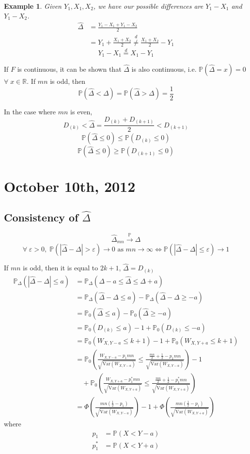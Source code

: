 \documentclass[a4paper,12pt]{amsart}
\newcommand{\Var}{\mbox{Var}}
\newcommand{\p}[1]{\mathbb{P}\left(#1\right)}
\newtheorem{ex}{Example}
\begin{document}
\begin{ex}
Given $Y_1, X_1, X_2$, we have our possible differences are $Y_1-X_1$ and $Y_1-X_2$. 
\begin{align*}
\widehat{\Delta} &= \frac{Y_1 - X_1 + Y_1 - X_2}{2}\\
&= Y_1 + \frac{X_1 + X_2}{2} \overset{d}{\neq} \frac{X_1 + X_2}{2} - Y_1
\end{align*}
\[Y_1 - X_1 \overset{d}{=} X_1 - Y_1 \]
\end{ex}

If $F$ is continuous, it can be shown that $\widehat{\Delta}$ is also continuous, i.e. $\p{\widehat{\Delta}=x}=0$ $\forall \; x \in \mathbb{R}$. If $mn$ is odd, then 
\[\p{\widehat{\Delta} < \Delta} = \p{\widehat{\Delta} > \Delta} = \frac{1}{2}\]

In the case where $mn$ is even,
\[D_{(k)} < \widehat{\Delta} = \frac{D_{(k)} + D_{(k+1)}}{2}< D_{(k+1)}\]
\[\p{\widehat{\Delta} \leq 0} \leq \p{D_{(k)}\leq 0}\]
\[\p{\widehat{\Delta} \leq 0} \geq \p{D_{(k+1)}\leq 0}\]


\section{October 10th, 2012}
\subsection{Consistency of $\widehat{\Delta}$}
\[\widehat{\Delta}_{mn} \overset{\mathbb{P}}{\to}\Delta \]
\[\forall \; \varepsilon > 0,\; \p{|\widehat{\Delta}-\Delta|> \varepsilon} \to 0 \text{ as } mn \to \infty \Leftrightarrow \p{|\widehat{\Delta} - \Delta| \leq \varepsilon} \to 1\]

If $mn$ is odd, then it is equal to $2k+1$, $\widehat{\Delta} = D_{(k)}$
\begin{align*}
\mathbb{P}_\Delta(|\widehat{\Delta} - \Delta| \leq a)&= \mathbb{P}_\Delta(\Delta - a \leq \widehat{\Delta} \leq \Delta + a)\\
&= \mathbb{P}_\Delta(\widehat{\Delta} - \Delta \leq a) - \mathbb{P}_\Delta(\widehat{\Delta} - \Delta \geq -a)\\
&= \mathbb{P}_0(\widehat{\Delta}\leq a) - \mathbb{P}_0(\widehat{\Delta}\geq -a)\\
&= \mathbb{P}_0(D_{(k)} \leq a) - 1 + \mathbb{P}_0(D_{(k)} \leq -a)\\
&= \mathbb{P}_0(W_{X,Y-a} \leq k+1) - 1 + \mathbb{P}_0(W_{X,Y+a}\leq k+1)\\
&= \mathbb{P}_0\left(\frac{W_{X,Y-a} - p_1mn}{\sqrt{\Var(W_{X,Y-a})}} \leq \frac{\frac{mn}{2} + \frac{1}{2} - p_1mn}{\sqrt{\Var(W_{X,Y-a})}}\right) - 1 \\
&\quad + \mathbb{P}_0\left(\frac{W_{X,Y+a} - p_1^*mn}{\sqrt{\Var(W_{X,Y+a})}} \leq \frac{\frac{mn}{2} + \frac{1}{2} - p_1^*mn}{\sqrt{\Var(W_{X,Y+a})}}\right)\\
&= \Phi\left(\frac{mn(\frac{1}{2}-p_1)}{\sqrt{\Var(W_{X,Y-a})}}\right) -1  + \Phi\left(\frac{mn(\frac{1}{2}-p_1)}{\sqrt{\Var(W_{X,Y+a})}}\right) 
\end{align*}
where
\begin{align*}
p_1 &= \p{X< Y-a}\\
p_1^* &= \p{X < Y + a}
\end{align*}
\end{document}
